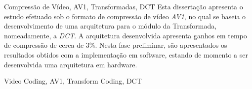 \TitlePage
  \vspace*{55mm}
       {Compressão de Vídeo, AV1, Transformadas, DCT}
       {Esta dissertação apresenta o estudo efetuado sob o formato de compressão de vídeo \emph{AV1}, no qual se baseia o desenvolvimento de uma arquitetura para o módulo da Transformada, nomeadamente, a \emph{DCT}. A arquitetura desenvolvida apresenta ganhos em tempo de compressão de cerca de $3\%$.}
  \TEXT{}
       {Nesta fase preliminar, são apresentados os resultados obtidos com a implementação em software, estando de momento a ser desenvolvida uma arquitetura em hardware.}
\EndTitlePage
\titlepage\ \endtitlepage %

\TitlePage
  \vspace*{55mm}
       {Video Coding, AV1, Transform Coding, DCT}
       {\lipsum[3]}
  \TEXT{}
       {}
\EndTitlePage
\titlepage\ \endtitlepage %
